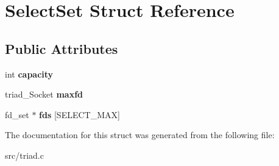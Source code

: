\hypertarget{struct_select_set}{}\section{Select\+Set Struct Reference}
\label{struct_select_set}
\subsection*{Public Attributes}
\begin{DoxyCompactItemize}
\item 
\mbox{\label{struct_select_set_a5fb59a3219783116f57552d4c644fcf0}} 
int {\bfseries capacity}
\item 
\mbox{\label{struct_select_set_a8cb26a4c494d8503c6cac05881b8be48}} 
triad\+\_\+\+Socket {\bfseries maxfd}
\item 
\mbox{\label{struct_select_set_a15219f90decc1a1360d54f45fd98151c}} 
fd\+\_\+set $\ast$ {\bfseries fds} \mbox{[}S\+E\+L\+E\+C\+T\+\_\+\+M\+AX\mbox{]}
\end{DoxyCompactItemize}


The documentation for this struct was generated from the following file\+:\begin{DoxyCompactItemize}
\item 
src/triad.\+c\end{DoxyCompactItemize}
